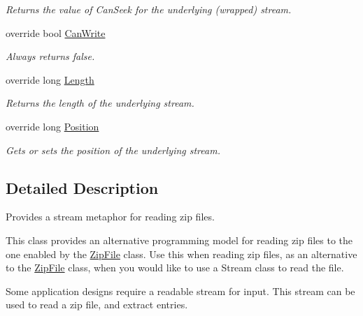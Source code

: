 \begin{DoxyCompactItemize}
\begin{DoxyCompactList}\small\item\em Returns the value of {\ttfamily Can\+Seek} for the underlying (wrapped) stream. \end{DoxyCompactList}\item 
override bool \mbox{\hyperlink{class_super_tiled2_unity_1_1_ionic_1_1_zip_1_1_zip_input_stream_a3f81c6724ec62db4d5c4cada5522a704}{Can\+Write}}
\begin{DoxyCompactList}\small\item\em Always returns false. \end{DoxyCompactList}\item 
override long \mbox{\hyperlink{class_super_tiled2_unity_1_1_ionic_1_1_zip_1_1_zip_input_stream_a02840abc14d29e5cd82ee0af6b814c21}{Length}}
\begin{DoxyCompactList}\small\item\em Returns the length of the underlying stream. \end{DoxyCompactList}\item 
override long \mbox{\hyperlink{class_super_tiled2_unity_1_1_ionic_1_1_zip_1_1_zip_input_stream_a5320273749e8a3c5c5676b7e19b612d2}{Position}}
\begin{DoxyCompactList}\small\item\em Gets or sets the position of the underlying stream. \end{DoxyCompactList}\end{DoxyCompactItemize}


\subsection{Detailed Description}
Provides a stream metaphor for reading zip files. 

This class provides an alternative programming model for reading zip files to the one enabled by the \mbox{\hyperlink{class_super_tiled2_unity_1_1_ionic_1_1_zip_1_1_zip_file}{Zip\+File}} class. Use this when reading zip files, as an alternative to the \mbox{\hyperlink{class_super_tiled2_unity_1_1_ionic_1_1_zip_1_1_zip_file}{Zip\+File}} class, when you would like to use a Stream class to read the file. 

Some application designs require a readable stream for input. This stream can be used to read a zip file, and extract entries. 

